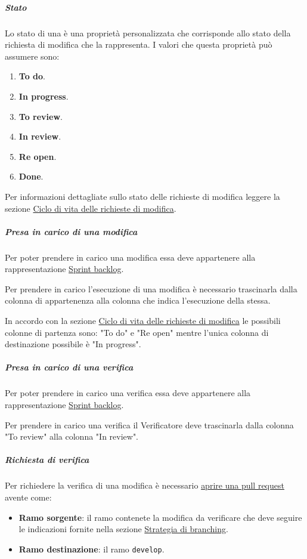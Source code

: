 \subparagraph{Stato}
\label{subpar:github_stato}
Lo stato di una  è una proprietà personalizzata che corrisponde allo stato della richiesta di modifica che la  rappresenta.
I valori che questa proprietà può assumere sono:
\begin{enumerate}
    \item \textbf{To do}.
    \item \textbf{In progress}.
    \item \textbf{To review}.
    \item \textbf{In review}.
    \item \textbf{Re open}.
    \item \textbf{Done}.
\end{enumerate}
Per informazioni dettagliate sullo stato delle richieste di modifica leggere la sezione \hyperref[par:ciclo_vita_richieste_di_modifica]{Ciclo di vita delle richieste di modifica}.

\subparagraph{Presa in carico di una modifica}
\label{subpar:presa_carico_modifica}
Per poter prendere in carico una modifica essa deve appartenere alla rappresentazione \hyperref[item:sprint_backlog]{Sprint backlog}.

Per prendere in carico l'esecuzione di una modifica è necessario trascinarla dalla colonna di appartenenza alla colonna che indica l'esecuzione della stessa.

In accordo con la sezione \hyperref[par:ciclo_vita_richieste_di_modifica]{Ciclo di vita delle richieste di modifica} le possibili colonne di partenza sono: "To do" e "Re open" mentre l'unica colonna di destinazione possibile è "In progress".

\subparagraph{Presa in carico di una verifica}
\label{subpar:presa_carico_verifica}
Per poter prendere in carico una verifica essa deve appartenere alla rappresentazione \hyperref[item:sprint_backlog]{Sprint backlog}.

Per prendere in carico una verifica il Verificatore deve trascinarla dalla colonna "To review" alla colonna "In review".

\subparagraph{Richiesta di verifica}
\label{subpar:github_richiesta_di_verifica}
Per richiedere la verifica di una modifica è necessario \hyperref[item:creazione_pull_request]{aprire una pull request} avente come:
\begin{itemize}
    \item \textbf{Ramo sorgente}: il ramo contenete la modifica da verificare che deve seguire le indicazioni fornite nella sezione \hyperref[subpar:strategia_di_branching_documenti]{Strategia di branching}.
    
    \item \textbf{Ramo destinazione}: il ramo \texttt{develop}.
\end{itemize}

